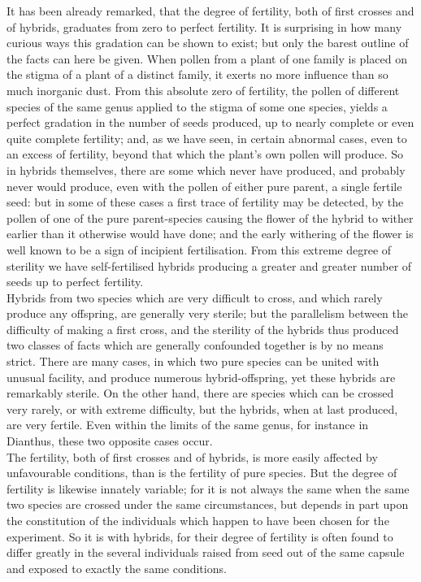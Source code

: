 \indent It has been already remarked, that the degree of fertility, both of first crosses and of hybrids, graduates from zero to perfect fertility. It is surprising in how many curious ways this gradation can be shown to exist; but only the barest outline of the facts can here be given. When pollen from a plant of one family is placed on the stigma of a plant of a distinct family, it exerts no more influence than so much inorganic dust. From this absolute zero of fertility, the pollen of different species of the same genus applied to the stigma of some one species, yields a perfect gradation in the number of seeds produced, up to nearly complete or even quite complete fertility; and, as we have seen, in certain abnormal cases, even to an excess of fertility, beyond that which the plant's own pollen will produce. So in hybrids themselves, there are some which never have produced, and probably never would produce, even with the pollen of either pure parent, a single fertile seed: but in some of these cases a first trace of fertility may be detected, by the pollen of one of the pure parent-species causing the flower of the hybrid to wither earlier than it otherwise would have done; and the early withering of the flower is well known to be a sign of incipient fertilisation. From this extreme degree of sterility we have self-fertilised hybrids producing a greater and greater number of seeds up to perfect fertility.\\
\indent Hybrids from two species which are very difficult to cross, and which rarely produce any offspring, are generally very sterile; but the parallelism between the difficulty of making a first cross, and the sterility of the hybrids thus produced two classes of facts which are generally confounded together is by no means strict. There are many cases, in which two pure species can be united with unusual facility, and produce numerous hybrid-offspring, yet these hybrids are remarkably sterile. On the other hand, there are species which can be crossed very rarely, or with extreme difficulty, but the hybrids, when at last produced, are very fertile. Even within the limits of the same genus, for instance in Dianthus, these two opposite cases occur.\\
\indent The fertility, both of first crosses and of hybrids, is more easily affected by unfavourable conditions, than is the fertility of pure species. But the degree of fertility is likewise innately variable; for it is not always the same when the same two species are crossed under the same circumstances, but depends in part upon the constitution of the individuals which happen to have been chosen for the experiment. So it is with hybrids, for their degree of fertility is often found to differ greatly in the several individuals raised from seed out of the same capsule and exposed to exactly the same conditions.\\

